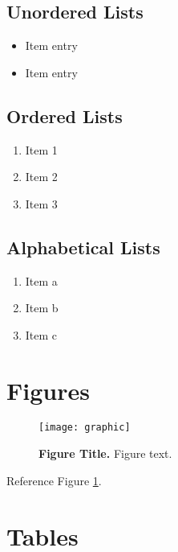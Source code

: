 \subsection{Unordered Lists} \label{unordered-lists}

\begin{itemize}
	\item Item entry
	\item Item entry
\end{itemize}

\subsection{Ordered Lists} \label{ordered-lists}

\begin{enumerate}
	\item Item 1
	\item Item 2
	\item Item 3
\end{enumerate}

\subsection{Alphabetical Lists} \label{alphabetical-list}

\begin{enumerate}[label=(\alph*)]
	\item Item a
	\item Item b
	\item Item c
\end{enumerate}




\section{Figures} \label{figures}

\begin{figure}[hb] \centering
	\texttt{[image: graphic]}
	\caption{\textbf{Figure Title.} Figure text.}
	\label{figure:1}
\end{figure}

Reference Figure \ref{figure:1}.




\section{Tables} \label{tables}

